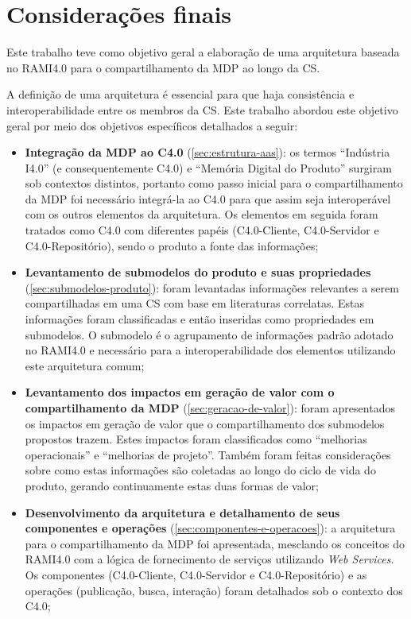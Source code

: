 \chapter{Considerações finais}
\label{cha:conclusao}

Este trabalho teve como objetivo geral a elaboração de uma arquitetura baseada no RAMI4.0 para o compartilhamento da MDP ao longo da CS.

A definição de uma arquitetura é essencial para que haja consistência e interoperabilidade entre os membros da CS. Este trabalho abordou este objetivo geral por meio dos objetivos específicos detalhados a seguir:

\begin{itemize}
  \item \textbf{Integração da MDP ao C4.0} (\autoref{sec:estrutura-aas}): os termos ``Indústria I4.0'' (e consequentemente C4.0) e ``Memória Digital do Produto'' surgiram sob contextos distintos, portanto como passo inicial para o compartilhamento da MDP foi necessário integrá-la ao C4.0 para que assim seja interoperável com os outros elementos da arquitetura. Os elementos em seguida foram tratados como C4.0 com diferentes papéis (C4.0-Cliente, C4.0-Servidor e C4.0-Repositório), sendo o produto a fonte das informações;
  \item \textbf{Levantamento de submodelos do produto e suas propriedades} (\autoref{sec:submodelos-produto}): foram levantadas informações relevantes a serem compartilhadas em uma CS com base em literaturas correlatas. Estas informações foram classificadas e então inseridas como propriedades em submodelos. O submodelo é o agrupamento de informações padrão adotado no RAMI4.0 e necessário para a interoperabilidade dos elementos utilizando este arquitetura comum;
  \item \textbf{Levantamento dos impactos em geração de valor com o compartilhamento da MDP} (\autoref{sec:geracao-de-valor}): foram apresentados os impactos em geração de valor que o compartilhamento dos submodelos propostos trazem. Estes impactos foram classificados como ``melhorias operacionais'' e ``melhorias de projeto''. Também foram feitas considerações sobre como estas informações são coletadas ao longo do ciclo de vida do produto, gerando continuamente estas duas formas de valor;
  \item \textbf{Desenvolvimento da arquitetura e detalhamento de seus componentes e operações} (\autoref{sec:componentes-e-operacoes}): a arquitetura para o compartilhamento da MDP foi apresentada, mesclando os conceitos do RAMI4.0 com a lógica de fornecimento de serviços utilizando \textit{Web Services}. Os componentes (C4.0-Cliente, C4.0-Servidor e C4.0-Repositório) e as operações (publicação, busca, interação) foram detalhados sob o contexto dos C4.0;

\end{itemize}
